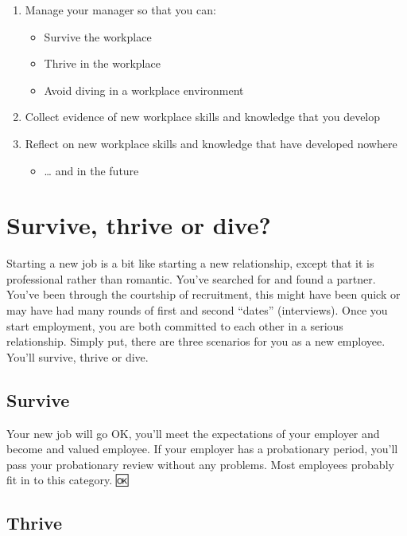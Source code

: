 \documentclass[
]{book}
\providecommand{\tightlist}{%
  \setlength{\itemsep}{0pt}\setlength{\parskip}{0pt}}
\begin{document}
\begin{enumerate}
\def\labelenumi{\arabic{enumi}.}
\tightlist
\item
  Manage your manager so that you can:

  \begin{itemize}
  \tightlist
  \item
    Survive the workplace
  \item
    Thrive in the workplace
  \item
    Avoid diving in a workplace environment
  \end{itemize}
\item
  Collect evidence of new workplace skills and knowledge that you develop
\item
  Reflect on new workplace skills and knowledge that have developed nowhere

  \begin{itemize}
  \tightlist
  \item
    \ldots{} and in the future
  \end{itemize}
\end{enumerate}

\hypertarget{scenarios}{%
\section{Survive, thrive or dive?}\label{scenarios}}

Starting a new job is a bit like starting a new relationship, except that it is professional rather than romantic. You've searched for and found a partner. You've been through the courtship of recruitment, this might have been quick or may have had many rounds of first and second ``dates'' (interviews). Once you start employment, you are both committed to each other in a serious relationship. Simply put, there are three scenarios for you as a new employee. You'll survive, thrive or dive.

\hypertarget{survive}{%
\subsection{Survive}\label{survive}}

Your new job will go OK, you'll meet the expectations of your employer and become and valued employee. If your employer has a probationary period, you'll pass your probationary review without any problems. Most employees probably fit in to this category. 🆗

\hypertarget{thrive}{%
\subsection{Thrive}\label{thrive}}
\end{document}
